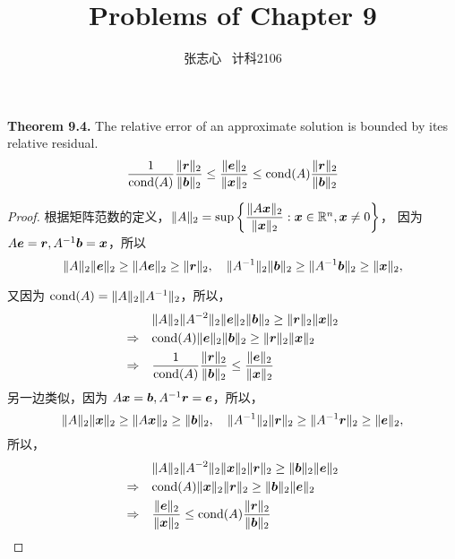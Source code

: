 \documentclass[lang=cn,a4paper,newtx,bibend=bibtex]{elegantpaper}
\title{Problems of Chapter 9}
\author{张志心 \ 计科2106}
\date{\zhdate{2024/03/25}}
\begin{document}
\maketitle

\begin{prob}[Exercise 9.5]
  \textbf{Theorem 9.4.} \quad The relative error of an approximate
   solution is bounded by ites relative residual.
  \[
    \dfrac{1}{\text{cond} (A)} \dfrac{\| \bm{r}\|_2}{\| \bm{b}\|_2}
    \le \dfrac{\| \bm{e} \|_2}{\| \bm{x} \|_2}
    \le \text{cond} (A) \dfrac{\| \bm{r}\|_2}{\| \bm{b}\|_2}
  \]
\end{prob}

\begin{proof}
  根据矩阵范数的定义，$\| A\|_2 = \sup\left\{\dfrac{\| A\bm{x}\|_2}{\|\bm{x}\|_2} : \bm{x} \in \mathbb{R}^n, \bm{x} \neq 0\right \}$，
  因为 $A \bm{e} = \bm{r}, A^{-1}\bm{b} = \bm{x}$，所以
  \[
    \| A\|_2\| \bm{e} \|_2 \ge \| A\bm{e} \|_2 \ge \| \bm{r} \|_2, 
    \quad
    \| A^{-1} \|_2 \| \bm{b} \|_2 \ge \| A^{-1}\bm{b} \|_2 \ge \| \bm{x} \|_2,
  \]

  又因为 $\text{cond} (A) = \| A\|_2 \| A^{-1}\|_2$，所以，
  \begin{equation*}
  \begin{aligned} 
    &\| A\|_2 \|A^{-2}\|_2 \|\bm{e}\|_2\|\bm{b}\|_2 \ge \|\bm{r}\|_2\|\bm{x}\|_2 \\
    \Rightarrow \quad &\text{cond} (A) \|\bm{e}\|_2\|\bm{b}\|_2 \ge \|\bm{r}\|_2\|\bm{x}\|_2 \\
    \Rightarrow \quad &\dfrac{1}{\text{cond}(A)} \dfrac{\|\bm{r}\|_2}{\|\bm{b}\|_2} \le 
                                     \dfrac{\|\bm{e}\|_2}{\|\bm{x}\|_2}
  \end{aligned}
  \end{equation*}
  另一边类似，因为 $A\bm{x} = \bm{b}, A^{-1}\bm{r} = \bm{e}$，所以，
  \[
    \| A\|_2\| \bm{x} \|_2 \ge \| A\bm{x} \|_2 \ge \| \bm{b} \|_2, 
    \quad
    \| A^{-1} \|_2 \| \bm{r} \|_2 \ge \| A^{-1}\bm{r} \|_2 \ge \| \bm{e} \|_2,
  \]
  所以，
  \begin{equation*}
    \begin{aligned} 
      &\| A\|_2 \|A^{-2}\|_2 \|\bm{x}\|_2\|\bm{r}\|_2 \ge \|\bm{b}\|_2\|\bm{e}\|_2 \\
      \Rightarrow \quad &\text{cond} (A) \|\bm{x}\|_2\|\bm{r}\|_2 \ge \|\bm{b}\|_2\|\bm{e}\|_2 \\
      \Rightarrow \quad &\dfrac{\|\bm{e}\|_2}{\|\bm{x}\|_2} \le \text{cond} (A) 
                         \dfrac{\|\bm{r}\|_2}{\|\bm{b}\|_2}
    \end{aligned}
    \end{equation*}
\end{proof}
\end{document}
